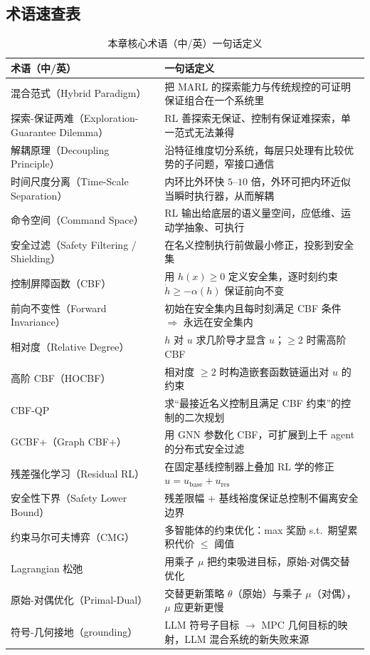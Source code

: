 \subsection*{术语速查表}
\begin{table}[H]\centering\small
\caption{本章核心术语（中/英）一句话定义}
\label{tab:mh-glossary}
\begin{tabular}{p{4.8cm}p{8.4cm}}
\toprule
术语（中/英） & 一句话定义 \\
\midrule
混合范式（Hybrid Paradigm） & 把 MARL 的探索能力与传统规控的可证明保证组合在一个系统里 \\
探索-保证两难（Exploration-Guarantee Dilemma） & RL 善探索无保证、控制有保证难探索，单一范式无法兼得 \\
解耦原理（Decoupling Principle） & 沿特征维度切分系统，每层只处理有比较优势的子问题，窄接口通信 \\
时间尺度分离（Time-Scale Separation） & 内环比外环快 $5$--$10$ 倍，外环可把内环近似当瞬时执行器，从而解耦 \\
命令空间（Command Space） & RL 输出给底层的语义量空间，应低维、运动学抽象、可执行 \\
安全过滤（Safety Filtering / Shielding） & 在名义控制执行前做最小修正，投影到安全集 \\
控制屏障函数（CBF） & 用 $h(x)\ge0$ 定义安全集，逐时刻约束 $\dot h\ge-\alpha(h)$ 保证前向不变 \\
前向不变性（Forward Invariance） & 初始在安全集内且每时刻满足 CBF 条件 $\Rightarrow$ 永远在安全集内 \\
相对度（Relative Degree） & $h$ 对 $u$ 求几阶导才显含 $u$；$\ge2$ 时需高阶 CBF \\
高阶 CBF（HOCBF） & 相对度 $\ge2$ 时构造嵌套函数链逼出对 $u$ 的约束 \\
CBF-QP & 求“最接近名义控制且满足 CBF 约束”的控制的二次规划 \\
GCBF+（Graph CBF+） & 用 GNN 参数化 CBF，可扩展到上千 agent 的分布式安全过滤 \\
残差强化学习（Residual RL） & 在固定基线控制器上叠加 RL 学的修正 $u=u_{\text{base}}+u_{\text{res}}$ \\
安全性下界（Safety Lower Bound） & 残差限幅 $+$ 基线裕度保证总控制不偏离安全边界 \\
约束马尔可夫博弈（CMG） & 多智能体的约束优化：max 奖励 s.t.\ 期望累积代价 $\le$ 阈值 \\
Lagrangian 松弛 & 用乘子 $\mu$ 把约束吸进目标，原始-对偶交替优化 \\
原始-对偶优化（Primal-Dual） & 交替更新策略 $\theta$（原始）与乘子 $\mu$（对偶），$\mu$ 应更新更慢 \\
符号-几何接地（grounding） & LLM 符号子目标 $\to$ MPC 几何目标的映射，LLM 混合系统的新失败来源 \\
\bottomrule
\end{tabular}
\end{table}

